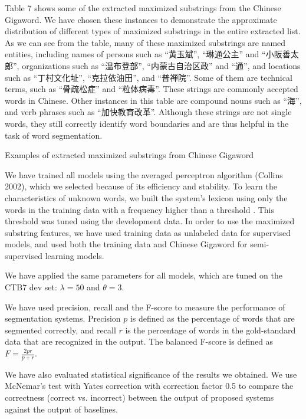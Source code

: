 \documentclass[english]{jnlp_1.4}
\begin{document}
Table 7 shows some of the extracted maximized substrings from the Chinese Gigaword. We have chosen these instances to demonstrate the approximate distribution of different types of maximized substrings in the entire extracted list. As we can see from the table, many of these maximized substrings are named entities, including names of persons such as ``黄玉斌'', ``琳通公主'' and ``小阪善太郎'', organizations such as ``温布登部'', ``内蒙古自治区政'' and ``通'', and locations such as ``丁村文化址'', ``克拉依油田'', and ``普禅院''. Some of them are technical terms, such as ``骨疏松症'' and ``粒体病毒''. These strings are commonly accepted words in Chinese. Other instances in this table are compound nouns such as ``海'', and verb phrases such as ``加快教育改革''. Although these strings are not single words, they still correctly identify word boundaries and are thus helpful in the task of word segmentation.

\begin{table}[b]
\caption{Examples of extracted maximized substrings from Chinese Gigaword}

\end{table}

We have trained all models using the averaged perceptron algorithm (Collins 2002), which we selected because of its efficiency and stability. To learn the characteristics of unknown words, we built the system's lexicon using only the words in the training data with a frequency higher than a threshold . This threshold was tuned using the development data. In order to use the maximized substring features, we have used training data as unlabeled data for supervised models, and used both the training data and Chinese Gigaword for semi-supervised learning models.

We have applied the same parameters for all models, which are tuned on the CTB7 dev set: $\lambda=50$ and $\theta=3$. 

We have used precision, recall and the F-score to measure the performance of segmentation systems. Precision $p$ is defined as the percentage of words that are segmented correctly, and recall $r$ is the percentage of words in the gold-standard data that are recognized in the output. The balanced F-score is defined as $F=\frac{2pr}{p+r}$.

We have also evaluated statistical significance of the results we obtained. We use McNemar's test with Yates correction with correction factor 0.5 to compare the correctness (correct vs. incorrect) between the output of proposed systems against the output of baselines.
\end{document}

